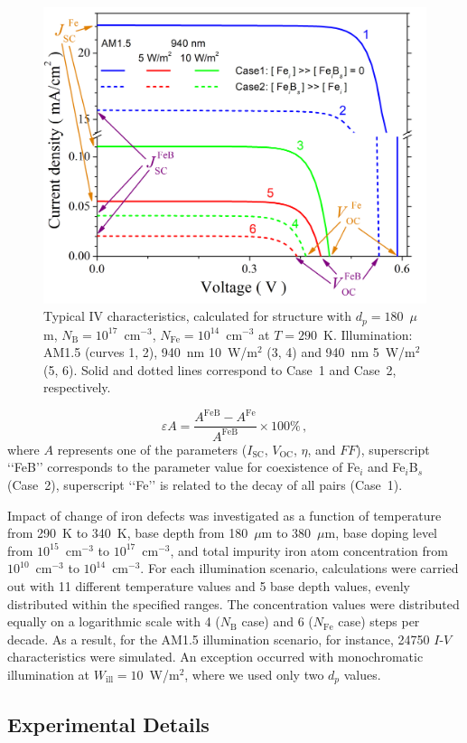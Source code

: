 \documentclass[a4paper,fleqn]{cas-sc}
\begin{document}
\begin{figure}
	\centering
		\includegraphics[width=0.5\linewidth]{Figure2.png}
	  \caption{Typical IV characteristics,
   calculated for structure with $d_p = 180$~$\mu$m, $N_\mathrm{B}=10^{17}$~cm$^{-3}$,
   $N_\mathrm{Fe}=10^{14}$~cm$^{-3}$ at $T = 290$~K.
   Illumination: AM1.5 (curves 1, 2), 940~nm 10~W/m$^{2}$ (3, 4) and 940~nm 5~W/m$^{2}$ (5, 6).
   Solid and dotted lines correspond to Case~1 and Case~2, respectively.}\label{fig2}
\end{figure}


\begin{equation}
\label{eq1}
    \varepsilon A = \frac{A^\mathrm{FeB} - A^\mathrm{Fe}}{A^\mathrm{FeB}} \times 100 \%\,,
\end{equation}
where $A$ represents one of the parameters ($I_\mathrm{SC}$, $V_\mathrm{OC}$, $\eta$, and $F\!F$),
superscript ‘‘FeB’’ corresponds to the parameter value for coexistence of Fe$_i$ and Fe$_i$B$_s$ (Case~2),
superscript ‘‘Fe’’ is related to the decay of all pairs (Case~1).


Impact of change of iron defects was investigated as a function of temperature from 290~K to 340~K,
base depth from 180~$\mu$m to 380~$\mu$m,
base doping level from $10^{15}$~cm$^{-3}$ to $10^{17}$~cm$^{-3}$,
and total impurity iron atom concentration from $10^{10}$~cm$^{-3}$ to $10^{14}$~cm$^{-3}$.
For each illumination scenario, calculations were carried out with 11 different temperature values and 5 base depth values,
evenly distributed within the specified ranges.
The concentration values were distributed equally on a logarithmic scale with 4 ($N_\mathrm{B}$ case) and 6 ($N_\mathrm{Fe}$ case) steps per decade.
As a result, for the AM1.5 illumination scenario, for instance, 24750 $I$-$V$ characteristics were simulated.
An exception occurred with monochromatic illumination at $W_\mathrm{ill} = 10$~W/m$^{2}$,
where we used only two $d_p$ values.

\subsection{Experimental Details}
\end{document}
